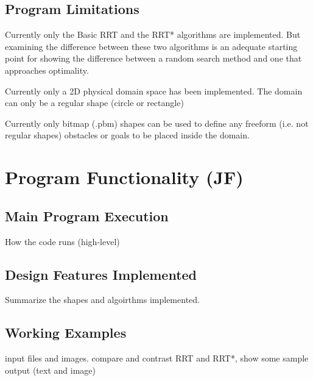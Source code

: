 \documentclass[10pt]{article}
\begin{document}
	\subsection{Program Limitations}
		Currently only the Basic RRT and the RRT* algorithms are implemented. But examining the difference between these two algorithms is an adequate starting point for showing the difference between a random search method and one that approaches optimality.
		
		Currently only a 2D physical domain space has been implemented. The domain can only be a regular shape (circle or rectangle)
		
		Currently only bitmap (.pbm) shapes can be used to define any freeform (i.e. not regular shapes) obstacles or goals to be placed inside the domain.

\newpage


\newpage
\section{Program Functionality (JF)}
	
	\subsection{Main Program Execution}
		How the code runs (high-level)
	
	\subsection{Design Features Implemented}
		Summarize the shapes and algoirthms implemented.
	
	\subsection{Working Examples}
		input files and images. compare and contrast RRT and RRT*, show some sample output (text and image)
		
\newpage

	
\end{document}
